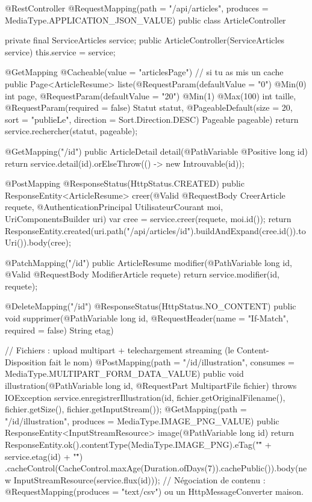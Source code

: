 \documentclass[12pt,a4paper,twoside,openright]{book}
\begin{document}
\begin{codejava}
@RestController
@RequestMapping(path = "/api/articles", produces = MediaType.APPLICATION_JSON_VALUE)
public class ArticleController {
    private final ServiceArticles service;
    public ArticleController(ServiceArticles service) { this.service = service; }

    @GetMapping
    @Cacheable(value = "articlesPage")                       // si tu as mis un cache
    public Page<ArticleResume> liste(@RequestParam(defaultValue = "0") @Min(0) int page,
                                     @RequestParam(defaultValue = "20") @Min(1) @Max(100) int taille,
                                     @RequestParam(required = false) Statut statut,
                                     @PageableDefault(size = 20, sort = "publieLe", direction = Sort.Direction.DESC)
                                     Pageable pageable) {
        return service.rechercher(statut, pageable);
    }

    @GetMapping("/{id}")
    public ArticleDetail detail(@PathVariable @Positive long id) { return service.detail(id).orElseThrow(() -> new Introuvable(id)); }

    @PostMapping
    @ResponseStatus(HttpStatus.CREATED)
    public ResponseEntity<ArticleResume> creer(@Valid @RequestBody CreerArticle requete,
                                               @AuthenticationPrincipal UtilisateurCourant moi,
                                               UriComponentsBuilder uri) {
        var cree = service.creer(requete, moi.id());
        return ResponseEntity.created(uri.path("/api/articles/{id}").buildAndExpand(cree.id()).toUri()).body(cree);
    }

    @PatchMapping("/{id}")
    public ArticleResume modifier(@PathVariable long id, @Valid @RequestBody ModifierArticle requete) { return service.modifier(id, requete); }

    @DeleteMapping("/{id}")
    @ResponseStatus(HttpStatus.NO_CONTENT)
    public void supprimer(@PathVariable long id, @RequestHeader(name = "If-Match", required = false) String etag) { }

    // Fichiers : upload multipart + telechargement streaming (le Content-Disposition fait le nom)
    @PostMapping(path = "/{id}/illustration", consumes = MediaType.MULTIPART_FORM_DATA_VALUE)
    public void illustration(@PathVariable long id, @RequestPart MultipartFile fichier) throws IOException {
        service.enregistrerIllustration(id, fichier.getOriginalFilename(), fichier.getSize(), fichier.getInputStream());
    }
    @GetMapping(path = "/{id}/illustration", produces = MediaType.IMAGE_PNG_VALUE)
    public ResponseEntity<InputStreamResource> image(@PathVariable long id) {
        return ResponseEntity.ok().contentType(MediaType.IMAGE_PNG).eTag("\"" + service.etag(id) + "\"")
                .cacheControl(CacheControl.maxAge(Duration.ofDays(7)).cachePublic()).body(new InputStreamResource(service.flux(id)));
    }
    // N\'egociation de contenu : @RequestMapping(produces = "text/csv") ou un HttpMessageConverter maison.
}


\end{codejava}
\end{document}
